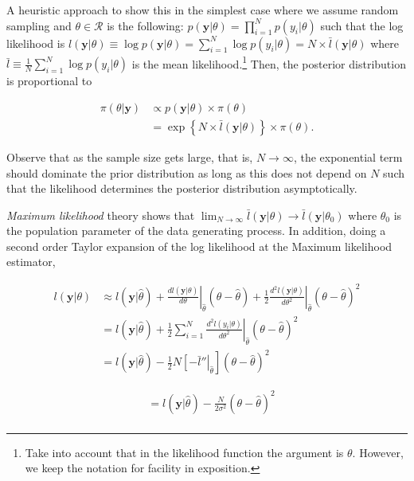 A heuristic approach to show this in the simplest case where we assume random sampling and $\theta\in \mathcal{R}$ is the following: $p(\mathbf{y}|\theta)=\prod_{i=1}^N p(y_i|\theta)$ such that the log likelihood is $l(\mathbf{y}|\theta)\equiv\log p(\mathbf{y}|\theta)=\sum_{i=1}^N \log p(y_i|\theta)=N\times \bar{l}(\mathbf{y}|\theta)$ where $\bar{l}\equiv\frac{1}{N}\sum_{i=1}^N \log p(y_i|\theta)$ is the mean likelihood.\footnote{Take into account that in the likelihood function the argument is $\theta$. However, we keep the notation for facility in exposition.} Then, the posterior distribution is proportional to 

\begin{align}
	\pi(\theta|\mathbf{y})&\propto p(\mathbf{y}|\theta) \times \pi(\theta)\nonumber\\
	&=\exp\left\{N\times \bar{l}(\mathbf{y}|\theta)\right\} \times \pi(\theta).
\end{align}

Observe that as the sample size gets large, that is, $N\rightarrow \infty$, the exponential term should dominate the prior distribution as long as this does not depend on $N$ such that the likelihood determines the posterior distribution asymptotically.

\textit{Maximum likelihood} theory shows that $\lim_{N\to\infty} \bar{l}(\mathbf{y}|\theta)\rightarrow \bar{l}(\mathbf{y}|\theta_0)$ where $\theta_0$ is the population parameter of the data generating process. In addition, doing a second order Taylor expansion of the log likelihood at the Maximum likelihood estimator,

\begin{align*}
	l(\mathbf{y}|\theta)&\approx l(\mathbf{y}|\hat{\theta})+\left.\frac{dl(\mathbf{y}|{\theta})}{d\theta}\right\vert_{\hat{\theta}}(\theta-\hat{\theta})+\frac{1}{2}\left.\frac{d^2l(\mathbf{y}|{\theta})}{d\theta^2}\right\vert_{\hat{\theta}}(\theta-\hat{\theta})^2\\
	&= l(\mathbf{y}|\hat{\theta})+\frac{1}{2}\left.\sum_{i=1}^N\frac{d^2l(y_i|{\theta})}{d\theta^2}\right\vert_{\hat{\theta}}(\theta-\hat{\theta})^2\\
	&= l(\mathbf{y}|\hat{\theta})-\frac{1}{2}\left.N\left[-\bar{l}''\right\vert_{\hat{\theta}}\right](\theta-\hat{\theta})^2 
\end{align*}

\begin{align*}
	&= l(\mathbf{y}|\hat{\theta})-\frac{N}{2\sigma^2}(\theta-\hat{\theta})^2\\ 
\end{align*}

